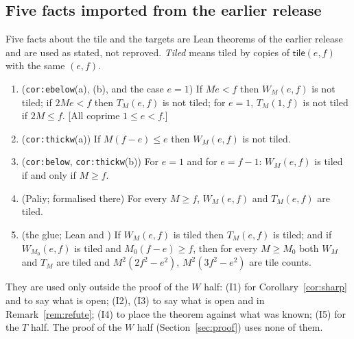 \documentclass[11pt,reqno]{amsart}
\theoremstyle{plain}
\theoremstyle{definition}
\newcommand{\tile}{\mathsf{tile}}
\begin{document}
\subsection{Five facts imported from the earlier release}\label{sub:import}
Five facts about the tile and the targets are Lean theorems of the earlier release \cite{ReleasePaper,Release22} and are used as stated, not reproved. \emph{Tiled} means tiled by copies of $\tile(e,f)$ with the same $(e,f)$.
\begin{enumerate}
\item[(I1)] (\texttt{cor:ebelow}(a), (b), and the case $e=1$) If $Me<f$ then $W_M(e,f)$ is not tiled; if $2Me<f$ then $T_M(e,f)$ is not tiled; for $e=1$, $T_M(1,f)$ is not tiled if $2M\le f$. [All coprime $1\le e<f$.]
\item[(I2)] (\texttt{cor:thickw}(a)) If $M(f-e)\le e$ then $W_M(e,f)$ is not tiled.
\item[(I3)] (\texttt{cor:below}, \texttt{cor:thickw}(b)) For $e=1$ and for $e=f-1$: $W_M(e,f)$ is tiled if and only if $M\ge f$.
\item[(I4)] (Paliy; formalised there) For every $M\ge f$, $W_M(e,f)$ and $T_M(e,f)$ are tiled.
\item[(I5)] (the glue; Lean  and ) If $W_M(e,f)$ is tiled then $T_M(e,f)$ is tiled; and if $W_{M_0}(e,f)$ is tiled and $M_0(f-e)\ge f$, then for every $M\ge M_0$ both $W_M$ and $T_M$ are tiled and $M^2(2f^2-e^2)$, $M^2(3f^2-e^2)$ are tile counts.
\end{enumerate}
They are used only outside the proof of the $W$ half: (I1) for Corollary~\ref{cor:sharp} and to say what is open; (I2), (I3) to say what is open and in Remark~\ref{rem:refute}; (I4) to place the theorem against what was known; (I5) for the $T$ half. The proof of the $W$ half (Section~\ref{sec:proof}) uses none of them.
\end{document}
